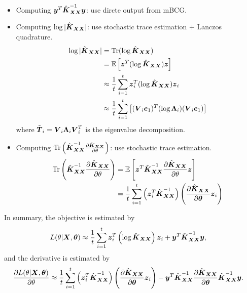 \documentclass{article}
\begin{document}
\begin{itemize}
  \item Computing $\by^T \hat{\bK}_{\bX\bX}^{-1} \by$: use dircte output from mBCG.
  \item Computing $\log | \hat{\bK}_{\bX \bX} |$: use stochastic trace estimation + Lanczos quadrature.
  \begin{align}
    \log | \hat{\bK}_{\bX \bX} | &= \textrm{Tr} (\log \hat{\bK}_{\bX \bX})\\
    & = \mathbb{E}\left[ \bz^T (\log \hat{\bK}_{\bX \bX}) \bz \right] \\
    & \approx \frac{1}{t} \sum_{i=1}^t \bz_i^T (\log \hat{\bK}_{\bX \bX}) \bz_i \\
    & \approx \frac{1}{t} \sum_{i=1}^t \left[ (\bV_i \be_1)^T (\log \bLambda_i ) (\bV_i \be_1) \right]
  \end{align}
  where $\tilde{\bT}_{i} =\bV_i \bLambda_i \bV_i^T$ is the eigenvalue decomposition.
  \item Computing $\textrm{Tr}\left( \hat{\bK}_{\bX \bX}^{-1} \frac{\partial \hat{\bK}_{\bX\bX}}{\partial \theta}\right)$: use stochastic trace estimation.
  \begin{align}
    \textrm{Tr}\left( \hat{\bK}_{\bX \bX}^{-1} \frac{\partial \hat{\bK}_{\bX\bX}}{\partial \theta}\right)
    &= \mathbb{E} \left[ \bz^T \hat{\bK}_{\bX \bX}^{-1} \frac{\partial \hat{\bK}_{\bX\bX}}{\partial \theta} \bz \right] \\
    &= \frac{1}{t} \sum_{i=1}^t \left(\bz_i^T \hat{\bK}_{\bX\bX}^{-1} \right) \left( \frac{\partial \hat{\bK}_{\bX \bX}}{\partial \btheta} \bz_i \right)
  \end{align}


\end{itemize}

In summary, the objective is estimated by
\begin{align}
  L(\theta | \bX, \btheta) & \approx \frac{1}{t} \sum_{i=1}^t \bz_i^T \left(\log \hat{\bK}_{\bX \bX} \right) \bz_i + \by^T \hat{\bK}_{\bX \bX}^{-1} \by,
\end{align}
and the derivative is estimated by
\begin{align}
  \frac{\partial L(\theta | \bX, \btheta)}{\partial \theta}
  &\approx \frac{1}{t} \sum_{i=1}^t \left( \bz_i^T \hat{\bK}_{\bX \bX}^{-1} \right)
  \left( \frac{\partial \hat{\bK}_{\bX\bX}}{\partial \btheta} \bz_i  \right)
  - \by^T \hat{\bK}_{\bX \bX}^{-1}  \frac{\partial \hat{\bK}_{\bX \bX}}{\partial \btheta} \hat{\bK}_{\bX \bX}^{-1} \by.
\end{align}
\end{document}
